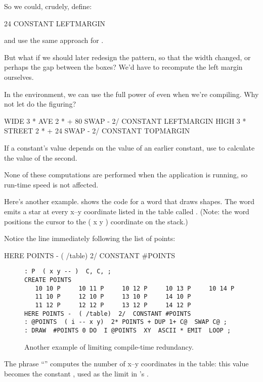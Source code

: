 \goodbreak
So we could, crudely, define:

\begin{Code}
24 CONSTANT LEFTMARGIN
\end{Code}
and use the same approach for .

But what if we should later redesign the pattern, so that the width
changed, or perhaps the gap between the boxes? We'd have to recompute
the left margin ourselves.

In the \Forth{} environment, we can use the full power of \Forth{}
even when we're compiling. Why not let \Forth{} do the figuring?

\begin{Code}
WIDE 3 *  AVE 2 *  +  80 SWAP -  2/ CONSTANT LEFTMARGIN
HIGH 3 *  STREET 2 * +  24 SWAP -  2/ CONSTANT TOPMARGIN
\end{Code}

\begin{tip}
If a constant's value depends on the value of an earlier constant, use
\Forth{} to calculate the value of the second.
\end{tip}
None of these computations are performed when the application is
running, so run-time speed is not affected.

Here's another example.  shows the code for a word that
draws shapes. The word  emits a star at every x--y
coordinate listed in the table called . (Note: the word
 positions the cursor to the ( x y ) coordinate on the
stack.)

Notice the line immediately following the list of points:

\begin{Code}
HERE POINTS -  ( /table)  2/  CONSTANT #POINTS
\end{Code}
\begin{figure*}[bbbb]
\caption{Another example of limiting compile-time redundancy.}
\begin{center}
\begin{BVerbatim}
: P  ( x y -- )  C, C, ;
CREATE POINTS
   10 10 P     10 11 P     10 12 P     10 13 P     10 14 P
   11 10 P     12 10 P     13 10 P     14 10 P
   11 12 P     12 12 P     13 12 P     14 12 P
HERE POINTS -  ( /table)  2/  CONSTANT #POINTS
: @POINTS  ( i -- x y)  2* POINTS + DUP 1+ C@  SWAP C@ ;
: DRAW  #POINTS 0 DO  I @POINTS  XY  ASCII * EMIT  LOOP ;
\end{BVerbatim}
\end{center}
\end{figure*}
The phrase ``'' computes the number of x--y
coordinates in the table: this value becomes the constant
, used as the limit in 's
.

